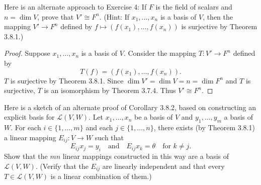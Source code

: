 \begin{tcolorbox}[title=Exercise 5, breakable]
    Here is an alternate approach to Exercise 4: If $F$ is the field of scalars 
    and $n = \dim V$, prove that $V' \cong F^n$. (Hint: If $x_1, \ldots, x_n$ is 
    a basis of $V$, then the mapping $V' \to F^n$ defined by 
    $f \mapsto (f(x_1), \ldots, f(x_n))$ is surjective by Theorem 3.8.1.)
\end{tcolorbox}

\begin{proof}
    Suppose $x_1, \ldots, x_n$ is a basis of $V$.
    Consider the mapping $T : V' \longrightarrow F^n$ defined by
    \[T(f) = (f(x_1), \ldots, f(x_n)).\]
    $T$ is surjective by Theorem 3.8.1.
    Since $\dim V' = \dim V = n = \dim F^n$ and $T$ is surjective, $T$ is an isomorphism by Theorem 3.7.4.
    Thus $V' \cong F^n$.
\end{proof}

\newpage
\begin{tcolorbox}[title=Exercise 6, breakable]
    Here is a sketch of an alternate proof of Corollary 3.8.2, 
    based on constructing an explicit basis for $\mathcal{L}(V, W)$. Let $x_1, \ldots, x_n$ 
    be a basis of $V$ and $y_1, \ldots, y_m$ a basis of $W$. For each $i \in \{1, \ldots, m\}$ 
    and each $j \in \{1, \ldots, n\}$, there exists (by Theorem 3.8.1) a linear mapping 
    $E_{ij} : V \to W$ such that
    \[E_{ij} x_j = y_i \quad \text{and} \quad E_{ij} x_k = \theta \quad \text{for } k \ne j.\]
    Show that the $mn$ linear mappings constructed in this way are a basis of 
    $\mathcal{L}(V, W)$. (Verify that the $E_{ij}$ are linearly independent and that every 
    $T \in \mathcal{L}(V, W)$ is a linear combination of them.)
\end{tcolorbox}

